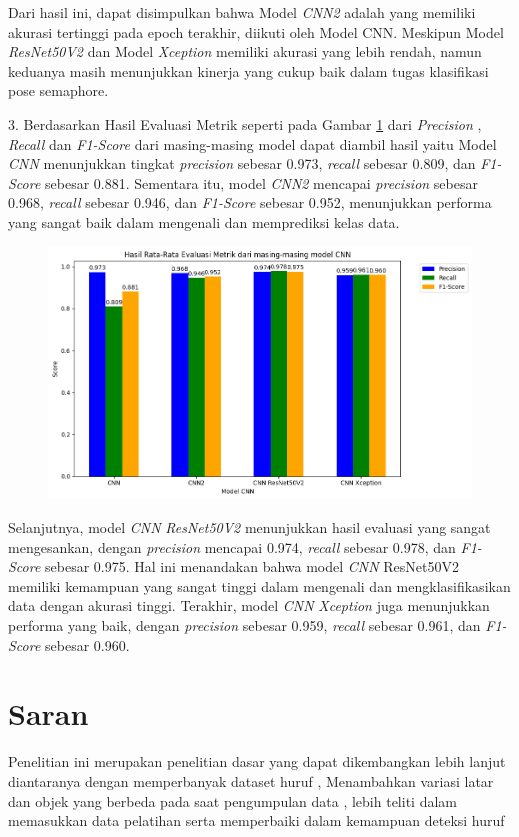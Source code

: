 Dari hasil ini, dapat disimpulkan bahwa Model \textit{CNN2} adalah yang memiliki akurasi tertinggi pada epoch terakhir, diikuti oleh Model CNN. Meskipun Model \textit{ResNet50V2} dan Model \textit{Xception} memiliki akurasi yang lebih rendah, namun keduanya masih menunjukkan kinerja yang cukup baik dalam tugas klasifikasi pose semaphore.

3. Berdasarkan Hasil Evaluasi Metrik seperti pada Gambar \ref{fig:GrafikPerbandinganEvaluasiMetrik} dari \textit{Precision} , \textit{Recall} dan \textit{F1-Score} dari masing-masing model dapat diambil hasil yaitu Model \textit{CNN} menunjukkan tingkat \textit{precision} sebesar 0.973, \textit{recall} sebesar 0.809, dan \textit{F1-Score} sebesar 0.881. Sementara itu, model \textit{CNN2} mencapai \textit{precision} sebesar 0.968, \textit{recall} sebesar 0.946, dan \textit{F1-Score} sebesar 0.952, menunjukkan performa yang sangat baik dalam mengenali dan memprediksi kelas data.
\begin{figure}[!hbt]
	\centering
	\includegraphics[width=0.7\linewidth]{gambar/bener/RataRataEvaluasiMetrik.png}
	\label{fig:GrafikPerbandinganEvaluasiMetrik}
\end{figure}
Selanjutnya, model \textit{CNN} \textit{ResNet50V2} menunjukkan hasil evaluasi yang sangat mengesankan, dengan \textit{precision} mencapai 0.974, \textit{recall} sebesar 0.978, dan \textit{F1-Score} sebesar 0.975. Hal ini menandakan bahwa model \textit{CNN} ResNet50V2 memiliki kemampuan yang sangat tinggi dalam mengenali dan mengklasifikasikan data dengan akurasi tinggi. Terakhir, model \textit{CNN} \textit{Xception} juga menunjukkan performa yang baik, dengan \textit{precision} sebesar 0.959, \textit{recall} sebesar 0.961, dan \textit{F1-Score} sebesar 0.960.

\section{Saran}
Penelitian ini merupakan penelitian dasar yang dapat dikembangkan lebih lanjut diantaranya dengan  memperbanyak dataset huruf ,	Menambahkan variasi latar dan objek yang berbeda pada saat pengumpulan data , lebih teliti dalam memasukkan data pelatihan serta memperbaiki dalam kemampuan deteksi huruf